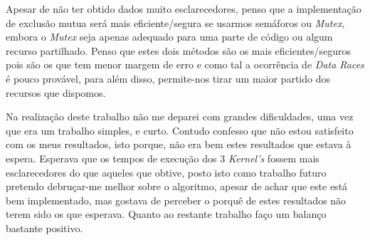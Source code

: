 \documentclass[conference,compsoc]{IEEEtran}
\begin{document}
Apesar de não ter obtido dados muito esclarecedores, penso que a implementação de exclusão mutua será mais eficiente/segura se usarmos semáforos ou \textit{Mutex}, embora o \textit{Mutex} seja apenas adequado para uma parte de código ou algum recurso partilhado. Penso que estes dois métodos são os mais eficientes/seguros pois são os que tem menor margem de erro e como tal a ocorrência de \textit{Data Races} é pouco provável, para além disso, permite-nos tirar um maior partido dos recursos que dispomos.

Na realização deste trabalho não me deparei com grandes dificuldades, uma vez que era um trabalho simples, e curto. Contudo confesso que não estou satisfeito com os meus resultados, isto porque, não era bem estes resultados que estava à espera. Esperava que os tempos de execução dos 3 \textit{Kernel's} fossem mais esclarecedores do que aqueles que obtive, posto isto como trabalho futuro pretendo debruçar-me melhor sobre o algoritmo, apesar de achar que este está bem implementado, mas gostava de perceber o porquê de estes resultados não terem sido os que esperava. Quanto ao restante trabalho faço um balanço bastante positivo.






%
%

\end{document}
